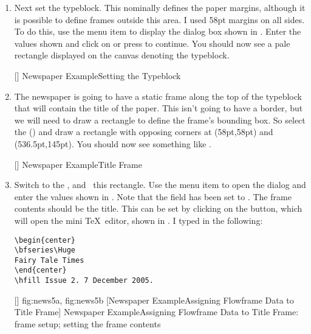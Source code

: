 \begin{enumerate}
[]
{}
{Newspaper Example\dash Setting the Storage Unit}

\item Next set the \gls{typeblock}. This nominally defines the paper
margins, although it is possible to define frames outside this
area. I used 58pt margins on all sides. To do this, use the
 menu item to display
the  dialog box shown in . Enter the values
shown and click on  or press 
to continue. You should now see a pale  rectangle displayed
on the \gls{canvas} denoting the \gls{typeblock}.

[]
{}
{Newspaper Example\dash Setting the Typeblock}

\item The newspaper is going to have a static frame along the
top of the \gls{typeblock} that will contain the title of the paper. This
isn't going to have a border, but we will need to draw a rectangle
to define the frame's bounding box. So select the
 () and draw a
rectangle with opposing corners at (58pt,58pt) and
(536.5pt,145pt). You should now see something like
.

[]
{}
{Newspaper Example\dash Title Frame}

\item Switch to the , and
\select\ this rectangle. Use the  menu item
to open the  dialog and enter the values
shown in . Note that the
 field has been set to
.
The frame contents should be the title.
This can be set by clicking on the 
button, which will open the mini \TeX\ editor, shown in
.
I typed in the following:
\begin{verbatim}
\begin{center}
\bfseries\Huge
Fairy Tale Times
\end{center}
\hfill Issue 2. 7 December 2005.
\end{verbatim}

[]
{
 {fig:news5a}{}{},
 {fig:news5b}{}{}
}
[Newspaper Example\dash Assigning Flowframe Data to Title Frame]
{Newspaper Example\dash Assigning Flowframe Data to Title
Frame:
 frame setup;
 setting the frame contents}


\end{enumerate}

